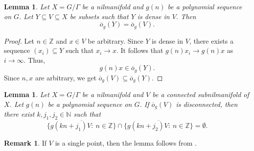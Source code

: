 \documentclass{article}
\theoremstyle{plain}
\newtheorem{lemma}[Theorem]{Lemma}
\theoremstyle{claim}
\theoremstyle{definition}
\newtheorem{remark}[Theorem]{Remark}
\theoremstyle{plain}
\theoremstyle{plain}
\newcommand{\N}{\mathbb{N}}
\newcommand{\Z}{\mathbb{Z}}
\newcommand{\1}{\boldsymbol{1}}
\newcommand{\orb}{\overline{o}}
\begin{document}
\begin{lemma}
\label{lem:dense_st_same_orbit_closure}
Let $X = G/\Gamma$ be a nilmanifold and $g(n)$ be a polynomial sequence on $G$. Let $Y \subseteq V \subseteq X$ be subsets such that $Y$ is dense in $V$. Then
\[
    \orb_g(Y) = \orb_g(V).
\]
\end{lemma}
\begin{proof}
Let $n \in \Z$ and $x \in V$ be arbitrary. Since $Y$ is dense in $V$, there exists a sequence $(x_i) \subseteq Y$ such that $x_i \to x$. It follows that $g(n) x_i \to g(n) x$ as $i \to \infty$. Thus,
\[
    g(n) x \in \orb_g(Y).
\]
Since $n, x$ are arbitrary, we get $\orb_g(V) \subseteq \orb_g(Y)$.
\end{proof}


\begin{lemma}\label{lem:disconnected_cannot}
Let $X = G/\Gamma$ be a nilmanifold and $V$ be a connected subnilmanifold of $X$. Let $g(n)$ be a polynomial sequence on $G$. If $\orb_{g}(V)$ is disconnected, then there exist $k, j_1, j_2 \in \N$ such that 
\[
    \overline{\{g(kn + j_1) V: \ n \in \Z\}} \cap \overline{\{g(kn + j_2) V: \ n \in \Z\}} = \emptyset.
\]
\end{lemma}

\begin{remark}
If $V$ is a single point, then the lemma follows from \cite[Theorem B]{Leibman05a}. 
\end{remark}
\end{document}
